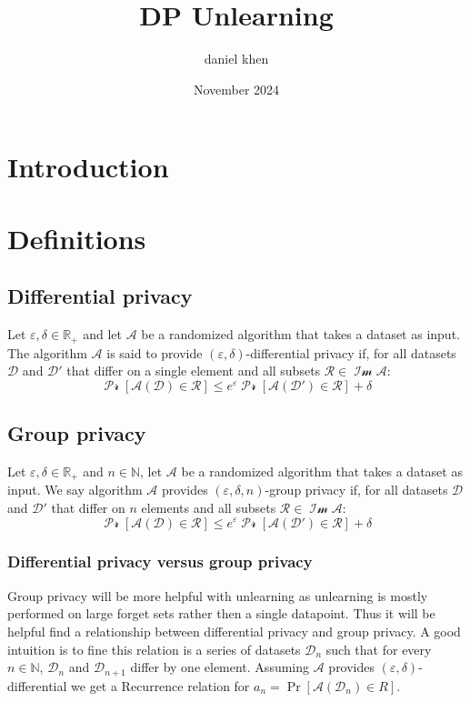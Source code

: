 \documentclass{article}
\title{DP Unlearning}
\author{daniel khen}
\date{November 2024}
\DeclareMathOperator{\Ima}{Im}
\begin{document}
\maketitle

\section{Introduction}

\section{Definitions}

\subsection{Differential privacy}

Let $\varepsilon, \delta \in \mathbb{R_+}$ and let $\mathcal{A}$ be a randomized algorithm that takes a dataset as input.
The algorithm $\mathcal{A}$ is said to provide $(\varepsilon, \delta)$-differential privacy if, for all datasets $\mathcal{D}$ and $\mathcal {D'}$ that differ on a single element and all subsets $\mathcal{R \in \Ima A}$:
\[ \mathcal{\Pr[A(D) \in R]} \leq e^\varepsilon \mathcal{\Pr[A(D') \in R]} + \delta \]

\subsection{Group privacy}

Let $\varepsilon, \delta \in \mathbb{R_+}$ and $n \in \mathbb{N}$, let $\mathcal{A}$ be a randomized algorithm that takes a dataset as input.
We say algorithm $\mathcal{A}$ provides $(\varepsilon, \delta, n)$-group privacy if, for all datasets $\mathcal{D}$ and $\mathcal {D'}$ that differ on $n$ elements and all subsets $\mathcal{R \in \Ima A}$:
\[ \mathcal{\Pr[A(D) \in R]} \leq e^\varepsilon \mathcal{\Pr[A(D') \in R]} + \delta \]

\subsubsection{Differential privacy versus group privacy}

Group privacy will be more helpful with unlearning as unlearning is mostly performed on large forget sets rather then a single datapoint. Thus it will be helpful find a relationship between differential privacy and group privacy. A good intuition is to fine this relation is a series of datasets $\mathcal{D}_n$ such that for every $n \in \mathbb{N}$, $\mathcal{D}_n$ and $\mathcal{D}_{n+1}$ differ by one element. Assuming $\mathcal{A}$ provides $(\varepsilon, \delta)$-differential we get a Recurrence relation for $a_n = \Pr[\mathcal{A}(\mathcal{D}_n) \in R]$.
\end{document}
